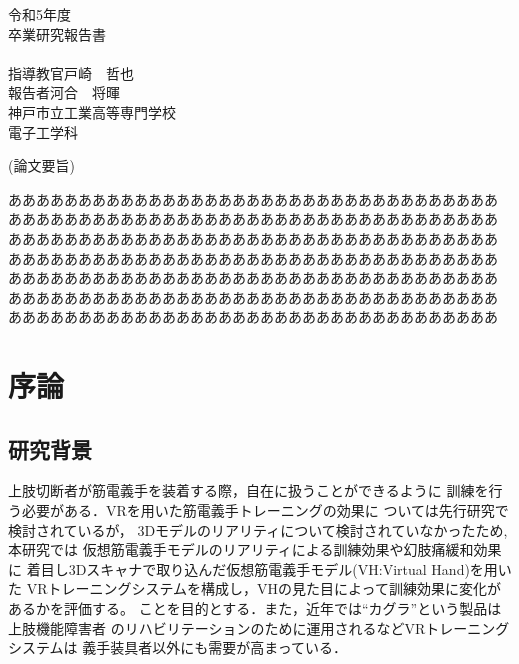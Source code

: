 \documentclass{ltjsreport}
\begin{document}
\begin{titlepage}
\begin{center}
\huge 令和5年度\\
\vspace{30pt}
\huge 卒業研究報告書\\
\vspace{50pt}
\HUGE{}\\
\vspace{200pt}
\huge 指導教官\hspace{10pt}戸崎　哲也\\
\huge 報告者\hspace{28pt}河合　将暉\\
\vspace{50pt}
\huge 神戸市立工業高等専門学校\\
\huge 電子工学科
\end{center}
\end{titlepage}
\restoregeometry
\clearpage

\begin{center}
\LARGE (論文要旨)
\end{center}
あああああああああああああああああああああああああああああああああああ
あああああああああああああああああああああああああああああああああああ
あああああああああああああああああああああああああああああああああああ
あああああああああああああああああああああああああああああああああああ
あああああああああああああああああああああああああああああああああああ
あああああああああああああああああああああああああああああああああああ
あああああああああああああああああああああああああああああああああああ
\clearpage

\setcounter{tocdepth}{3}
\tableofcontents
\setcounter{page}{1}

\chapter{序論}
	\section{研究背景}
	上肢切断者が筋電義手を装着する際，自在に扱うことができるように
	訓練を行う必要がある．VRを用いた筋電義手トレーニングの効果に
	ついては先行研究\cite{ref:1}\cite{ref:2}で検討されているが，
	3Dモデルのリアリティについて検討されていなかったため, 本研究では
	仮想筋電義手モデルのリアリティによる訓練効果や幻肢痛緩和効果に
	着目し3Dスキャナで取り込んだ仮想筋電義手モデル(VH:Virtual Hand)を用いた
	VRトレーニングシステムを構成し，VHの見た目によって訓練効果に変化があるかを評価する。
	ことを目的とする．また，近年では``カグラ''\cite{ref:5}という製品は上肢機能障害者
	のリハビリテーションのために運用されるなどVRトレーニングシステムは
	義手装具者以外にも需要が高まっている．
\end{document}
